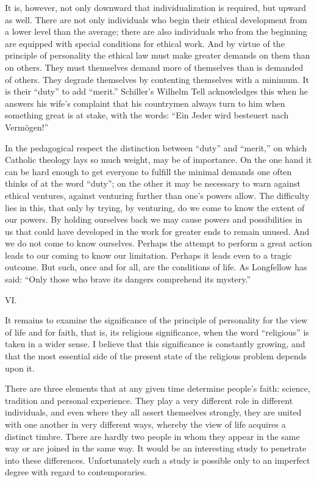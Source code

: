 \documentclass[12pt]{article}
\newcommand{\opage}[1]{\marginnote{\footnotesize\textit{[#1]}}}
\begin{document}
It is, however, not only downward that individualization is required, but upward
as well. There are not only individuals who begin their ethical development from
a lower level than the average; there are also individuals who from the
beginning are equipped with special conditions for ethical work. And by virtue of
the principle of personality the ethical law must make greater demands on them
than on others. They must themselves demand more of themselves than is demanded
of others. They degrade themselves by contenting themselves with a minimum. It is
their ``duty'' to add ``merit.'' Schiller's Wilhelm Tell acknowledges this when
he answers his wife's complaint that his countrymen always turn to him when
something great is at stake, with the words: ``Ein Jeder wird besteuert nach
Vermögen!''

In the pedagogical respect the distinction between ``duty'' and ``merit,'' on
which
\opage{59}%
Catholic theology lays so much weight, may be of importance. On the one hand it
can be hard enough to get everyone to fulfill the minimal demands one often
thinks of at the word ``duty''; on the other it may be necessary to warn against
ethical ventures, against venturing further than one's powers allow. The
difficulty lies in this, that only by trying, by venturing, do we come to know
the extent of our powers. By holding ourselves back we may cause powers and
possibilities in us that could have developed in the work for greater ends to
remain unused. And we do not come to know ourselves. Perhaps the attempt to
perform a great action leads to our coming to know our limitation. Perhaps it
leads even to a tragic outcome. But such, once and for all, are the conditions
of life. As Longfellow has said: ``Only those who brave its dangers comprehend
its mystery.'' %

\opage{60}
\begin{center}\large VI.\end{center}

It remains to examine the significance of the principle of personality for the
view of life and for faith, that is, its religious significance, when the word
``religious'' is taken in a wider sense. I believe that this significance is
constantly growing, and that the most essential side of the present state of the
religious problem depends upon it.

There are three elements that at any given time determine people's faith:
science, tradition and personal experience. They play a very different role in
different individuals, and even where they all assert themselves strongly, they
are united with one another in very different ways, whereby the view of life
acquires a distinct timbre. There are hardly two people in whom they appear in
the same way or are joined in the same way. It would be
\opage{61}%
an interesting study to penetrate into these differences. Unfortunately such a
study is possible only to an imperfect degree with regard to contemporaries.
\end{document}
